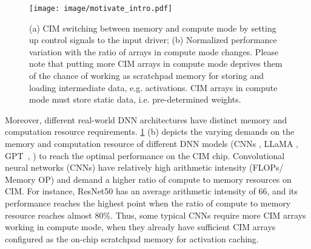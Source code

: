 
\begin{figure}[t]
    \centering
    \texttt{[image: image/motivate\_intro.pdf]}
    \caption{(a) CIM switching between memory and compute mode by setting up control signals to the input driver; (b) Normalized performance variation with the ratio of arrays in compute mode changes. Please note that putting more CIM arrays in compute mode deprives them of the chance of working as scratchpad memory for storing and loading intermediate data, e.g. activations. CIM arrays in compute mode must store static data, i.e. pre-determined weights.}
    \label{fig:intro}
\end{figure}
Moreover, different real-world DNN architectures have distinct memory and computation resource requirements. \fig\ref{fig:intro} (b) depicts the varying demands on the memory and computation resource of different DNN models (\ie CNNs \cite{he2016deep}, LLaMA \cite{touvron2023llama}, GPT~\cite{brown2020language}, \etc) to reach the optimal performance on the CIM chip.
Convolutional neural networks (CNNs) have relatively high arithmetic intensity (FLOPs/ Memory OP) and demand a higher ratio of compute to memory resources on CIM. For instance,  ResNet50 has an average arithmetic intensity of 66, and its performance reaches the highest point when the ratio of compute to memory resource reaches almost 80\%. Thus, some typical CNNs require more CIM arrays working in compute mode, when they already have sufficient CIM arrays configured as the on-chip scratchpad memory for activation caching.
